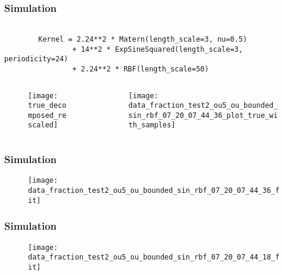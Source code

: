 \documentclass[
	8pt, %
]{beamer}
\begin{document}
\begin{frame}[fragile]
	\frametitle{Simulation}

	\begin{verbatim}

		Kernel = 2.24**2 * Matern(length_scale=3, nu=0.5)
				+ 14**2 * ExpSineSquared(length_scale=3, periodicity=24)
				+ 2.24**2 * RBF(length_scale=50)

	\end{verbatim}

		\begin{columns}[c] %
		\begin{column}{0.45\textwidth} %
				\begin{figure}
					\texttt{[image: true\_decomposed\_rescaled]}
				\end{figure}
		\end{column}
		\begin{column}{0.5\textwidth} %
				\begin{figure}
					\texttt{[image: data\_fraction\_test2\_ou5\_ou\_bounded\_sin\_rbf\_07\_20\_07\_44\_36\_plot\_true\_with\_samples]}
				\end{figure}

		\end{column}
	\end{columns}


\end{frame}

\begin{frame}
	\frametitle{Simulation}


	\begin{figure}
			\texttt{[image: data\_fraction\_test2\_ou5\_ou\_bounded\_sin\_rbf\_07\_20\_07\_44\_36\_fit]}
	\end{figure}

\end{frame}



\begin{frame}
	\frametitle{Simulation}

	\begin{figure}
			\texttt{[image: data\_fraction\_test2\_ou5\_ou\_bounded\_sin\_rbf\_07\_20\_07\_44\_18\_fit]}
	\end{figure}

\end{frame}
\end{document}
